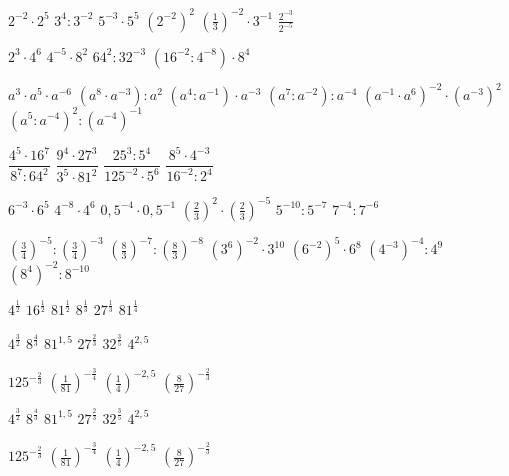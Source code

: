 \documentclass[12pt,a4paper]{article}
\begin{document}
	{$2^{-2}\cdot 2^5$}
	{$3^4:3^{-2}$}
	{$5^{-3}\cdot 5^5$}
	{$\left(2^{-2}\right)^2$}
	{$\left(\frac{1}{3}\right)^{-2}\cdot 3^{-1}$}
	{$\frac{2^{-3}}{2^{-5}}$}
	
	{$2^3\cdot 4^6$}
	{$4^{-5}\cdot 8^2$}
	{$64^2:32^{-3}$}
	{$(16^{-2}:4^{-8})\cdot 8^4$}
	
	{$a^3\cdot a^5\cdot a^{-6}$}
	{$(a^8\cdot a^{-3}):a^2$}
	{$(a^4:a^{-1})\cdot a^{-3}$}
	{$(a^7:a^{-2}):a^{-4}$}
	{$(a^{-1}\cdot a^6)^{-2}\cdot(a^{-3})^2$}
	{$(a^5:a^{-4})^2:(a^{-4})^{-1}$}
	
	{$\dfrac{4^5\cdot 16^7}{8^7:64^2}$}
	{$\dfrac{9^4\cdot 27^3}{3^5\cdot 81^2}$}
	{$\dfrac{25^3:5^4}{125^{-2}\cdot 5^6}$}
	{$\dfrac{8^5\cdot 4^{-3}}{16^{-2}:2^4}$}
	
	\zadanieDomowe
	
	{$6^{-3}\cdot 6^5$}
	{$4^{-8}\cdot 4^6$}
	{$0{,}5^{-4}\cdot 0{,}5^{-1}$}
	{$\left(\frac{2}{3}\right)^2\cdot\left(\frac{2}{3}\right)^{-5}$}
	{$5^{-10}:5^{-7}$}
	{$7^{-4}:7^{-6}$}
	
	{$\left(\frac{3}{4}\right)^{-5}:\left(\frac{3}{4}\right)^{-3}$}
	{$\left(\frac{8}{3}\right)^{-7}:\left(\frac{8}{3}\right)^{-8}$}
	{$(3^6)^{-2}\cdot 3^{10}$}
	{$(6^{-2})^5\cdot 6^8$}
	{$(4^{-3})^{-4}:4^9$}
	{$(8^4)^{-2}:8^{-10}$}
	
	\newpage {} \setcounter{zadaniaIndex}{0}
	
	{$4^{\frac{1}{2}}$}
	{$16^{\frac{1}{2}}$}
	{$81^{\frac{1}{2}}$}
	{$8^{\frac{1}{3}}$}
	{$27^{\frac{1}{3}}$}
	{$81^{\frac{1}{4}}$}
	
	{$4^{\frac{3}{2}}$}
	{$8^{\frac{4}{3}}$}
	{$81^{1{,}5}$}
	{$27^{\frac{2}{3}}$}
	{$32^{\frac{3}{5}}$}
	{$4^{2{,}5}$}
	
	{$125^{-\frac{2}{3}}$}
	{$\left(\frac{1}{81}\right)^{-\frac{3}{4}}$}
	{$\left(\frac{1}{4}\right)^{-2{,}5}$}
	{$\left(\frac{8}{27}\right)^{-\frac{2}{3}}$}
	
	{$4^{\frac{3}{2}}$}
	{$8^{\frac{4}{3}}$}
	{$81^{1,5}$}
	{$27^{\frac{2}{3}}$}
	{$32^{\frac{3}{5}}$}
	{$4^{2{,}5}$}
	
	{$125^{-\frac{2}{3}}$}
	{$\left(\frac{1}{81}\right)^{-\frac{3}{4}}$}
	{$\left(\frac{1}{4}\right)^{-2{,}5}$}
	{$\left(\frac{8}{27}\right)^{-\frac{2}{3}}$}
	
\end{document}
